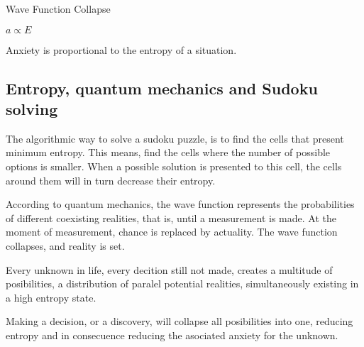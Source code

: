 
\begin{center}
\vspace*{\fill}
\Huge Wave Function Collapse

\vspace{2cm}

\begin{flushright}
\large
\textit{ $a \propto E$ }
\end{flushright}
\vspace*{\fill}
\end{center}

\normalsize


Anxiety is proportional to the entropy of a situation. 


\subsection*{ Entropy, quantum mechanics and Sudoku solving} 

The algorithmic way to solve a sudoku puzzle, is to find the cells 
that present minimum entropy. 
This means, find the cells where the number of possible options is smaller.
When a possible solution is presented to this cell, the cells around them will 
in turn decrease their entropy. 

According to quantum mechanics, the wave function represents the probabilities 
of different coexisting realities, that is, until a 
measurement is made. At the moment of measurement, chance is replaced by 
actuality. The wave function collapses, and reality is set.

Every unknown in life, every decition still not made, creates a multitude of 
posibilities, a distribution of paralel potential realities, simultaneously 
existing in a high entropy state. 

Making a decision, or a discovery, will collapse all posibilities into one, 
reducing entropy and in consecuence reducing the asociated anxiety for the unknown. 







